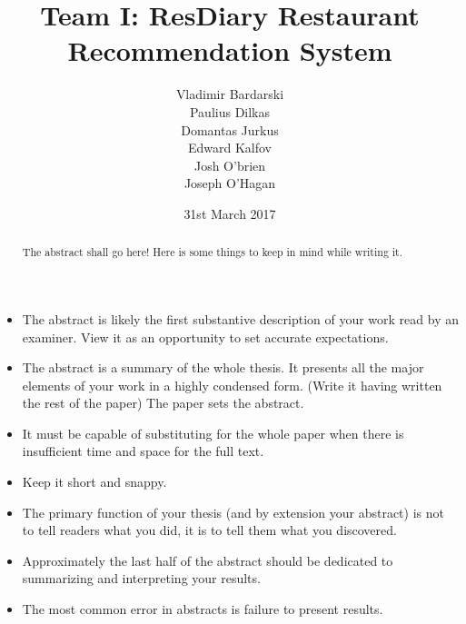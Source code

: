 \documentclass{l3proj}
\begin{document}
\title{Team I: ResDiary Restaurant Recommendation System}

\author{Vladimir Bardarski \\
        Paulius Dilkas \\
        Domantas Jurkus \\
        Edward Kalfov \\
        Josh O'brien \\
		Joseph O'Hagan}

\date{31st March 2017}

\maketitle

\begin{abstract}
The abstract shall go here! Here is some things to keep in mind while writing it.
\end{abstract}

\begin{itemize}
\item The abstract is likely the first substantive description of your work read by an examiner. View it as an opportunity to set accurate expectations.
\item The abstract is a summary of the whole thesis. It presents all the major elements of your work in a highly condensed form. (Write it having written the rest of the paper) The paper sets the abstract.
\item It must be capable of substituting for the whole paper when there is insufficient time and space for the full text.
\item Keep it short and snappy. 
\item The primary function of your thesis (and by extension your abstract) is not to tell readers what you did, it is to tell them what you discovered.
\item Approximately the last half of the abstract should be dedicated to summarizing and interpreting your results.
\item The most common error in abstracts is failure to present results.
\end{itemize}

\educationalconsent
\end{document}
